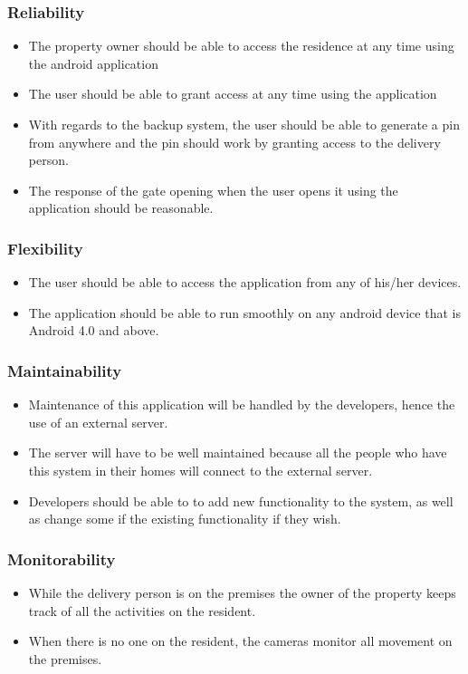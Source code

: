 \documentclass[a4paper,12pt]{article}
\begin{document}
	\subsubsection{Reliability}
	\begin{itemize}
		\item The property owner should be able to access the residence at any time using the android application 
		\item The user should be able to grant access at any time using the application
		\item With regards to the backup system, the user should be able to generate a pin from anywhere and the pin should work by granting access to the delivery person. 
		\item The response of the gate opening when the user opens it using the application should be reasonable.
	\end{itemize}
	
	\subsubsection{Flexibility}
	\begin{itemize}
		\item The user should be able to access the application from any of his/her devices.
		\item The application should be able to run smoothly on any android device that is Android 4.0 and above.
	\end{itemize}
	
	\subsubsection{Maintainability}
	\begin{itemize}
		\item Maintenance of this application will be handled by the developers, hence the use of an external server.
		\item The server will have to be well maintained because all the people who have this system in their homes will connect to the external server. 
		\item Developers should be able to to add new functionality to the system, as well as change some if the existing functionality if they wish.
	\end{itemize}
	
	\subsubsection{Monitorability}
	\begin{itemize}
		\item While the delivery person is on the premises the owner of the property keeps track of all the activities on the resident. 
		\item When there is no one on the resident, the cameras monitor all movement on the premises.  
	\end{itemize}
	
\end{document}
